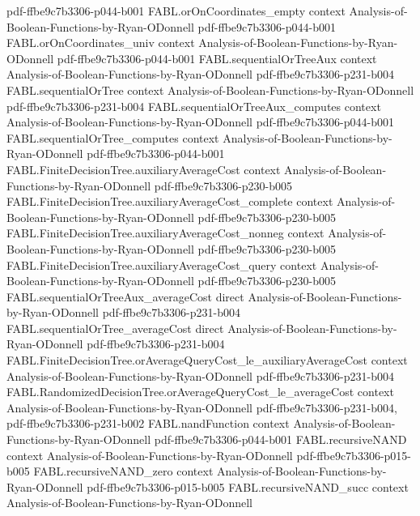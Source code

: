\begin{theorem}
  {pdf-ffbe9c7b3306-p044-b001}
\proofstep
  {FABL.orOnCoordinates_empty}
  {context}
  {Analysis-of-Boolean-Functions-by-Ryan-ODonnell}
  {pdf-ffbe9c7b3306-p044-b001}
\proofstep
  {FABL.orOnCoordinates_univ}
  {context}
  {Analysis-of-Boolean-Functions-by-Ryan-ODonnell}
  {pdf-ffbe9c7b3306-p044-b001}
\proofstep
  {FABL.sequentialOrTreeAux}
  {context}
  {Analysis-of-Boolean-Functions-by-Ryan-ODonnell}
  {pdf-ffbe9c7b3306-p231-b004}
\proofstep
  {FABL.sequentialOrTree}
  {context}
  {Analysis-of-Boolean-Functions-by-Ryan-ODonnell}
  {pdf-ffbe9c7b3306-p231-b004}
\proofstep
  {FABL.sequentialOrTreeAux_computes}
  {context}
  {Analysis-of-Boolean-Functions-by-Ryan-ODonnell}
  {pdf-ffbe9c7b3306-p044-b001}
\proofstep
  {FABL.sequentialOrTree_computes}
  {context}
  {Analysis-of-Boolean-Functions-by-Ryan-ODonnell}
  {pdf-ffbe9c7b3306-p044-b001}
\proofstep
  {FABL.FiniteDecisionTree.auxiliaryAverageCost}
  {context}
  {Analysis-of-Boolean-Functions-by-Ryan-ODonnell}
  {pdf-ffbe9c7b3306-p230-b005}
\proofstep
  {FABL.FiniteDecisionTree.auxiliaryAverageCost_complete}
  {context}
  {Analysis-of-Boolean-Functions-by-Ryan-ODonnell}
  {pdf-ffbe9c7b3306-p230-b005}
\proofstep
  {FABL.FiniteDecisionTree.auxiliaryAverageCost_nonneg}
  {context}
  {Analysis-of-Boolean-Functions-by-Ryan-ODonnell}
  {pdf-ffbe9c7b3306-p230-b005}
\proofstep
  {FABL.FiniteDecisionTree.auxiliaryAverageCost_query}
  {context}
  {Analysis-of-Boolean-Functions-by-Ryan-ODonnell}
  {pdf-ffbe9c7b3306-p230-b005}
\proofstep
  {FABL.sequentialOrTreeAux_averageCost}
  {direct}
  {Analysis-of-Boolean-Functions-by-Ryan-ODonnell}
  {pdf-ffbe9c7b3306-p231-b004}
\proofstep
  {FABL.sequentialOrTree_averageCost}
  {direct}
  {Analysis-of-Boolean-Functions-by-Ryan-ODonnell}
  {pdf-ffbe9c7b3306-p231-b004}
\proofstep
  {FABL.FiniteDecisionTree.orAverageQueryCost_le_auxiliaryAverageCost}
  {context}
  {Analysis-of-Boolean-Functions-by-Ryan-ODonnell}
  {pdf-ffbe9c7b3306-p231-b004}
\proofstep
  {FABL.RandomizedDecisionTree.orAverageQueryCost_le_averageCost}
  {context}
  {Analysis-of-Boolean-Functions-by-Ryan-ODonnell}
  {pdf-ffbe9c7b3306-p231-b004,
    pdf-ffbe9c7b3306-p231-b002}
\proofstep
  {FABL.nandFunction}
  {context}
  {Analysis-of-Boolean-Functions-by-Ryan-ODonnell}
  {pdf-ffbe9c7b3306-p044-b001}
\proofstep
  {FABL.recursiveNAND}
  {context}
  {Analysis-of-Boolean-Functions-by-Ryan-ODonnell}
  {pdf-ffbe9c7b3306-p015-b005}
\proofstep
  {FABL.recursiveNAND_zero}
  {context}
  {Analysis-of-Boolean-Functions-by-Ryan-ODonnell}
  {pdf-ffbe9c7b3306-p015-b005}
\proofstep
  {FABL.recursiveNAND_succ}
  {context}
  {Analysis-of-Boolean-Functions-by-Ryan-ODonnell}

\end{theorem}
